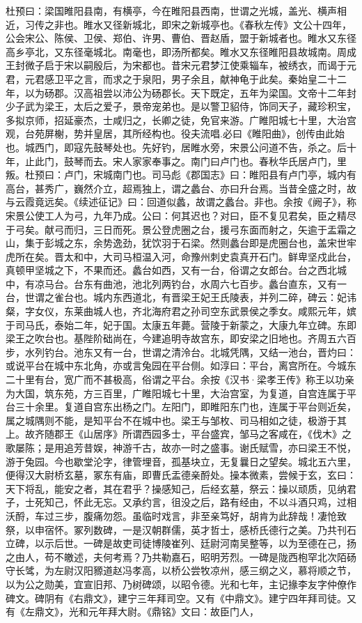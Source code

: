 \documentclass[12pt,UTF8]{ctexbook}
\begin{document}
杜预曰：梁国睢阳县南，有横亭，今在睢阳县西南，世谓之光城，盖光、横声相近，习传之非也。睢水又径新城北，即宋之新城亭也。《春秋左传》文公十四年，公会宋公、陈侯、卫侯、郑伯、许男、曹伯、晋赵盾，盟于新城者也。睢水又东径高乡亭北，又东径毫城北。南毫也，即汤所都矣。睢水又东径睢阳县故城南。周成王封微子启于宋以嗣殷后，为宋都也。昔宋元君梦江使乘辎车，被绣衣，而谒于元君，元君感卫平之言，而求之于泉阳，男子余且，献神龟于此矣。秦始皇二十二年，以为砀郡。汉高祖尝以沛公为砀郡长。天下既定，五年为梁国。文帝十二年封少子武为梁王，太后之爱子，景帝宠弟也。是以警卫貂侍，饰同天子，藏珍积宝，多拟京师，招延豪杰，士咸归之，长卿之徒，免官来游。广睢阳城七十里，大治宫观，台苑屏榭，势并皇居，其所经构也。役夫流唱.必曰《睢阳曲》，创传由此始也。城西门，即寇先鼓琴处也。先好钓，居睢水旁，宋景公问道不告，杀之。后十年，止此门，鼓琴而去。宋人家家奉事之。南门曰卢门也。春秋华氏居卢门，里叛。杜预曰：卢门，宋城南门也。司马彪《郡国志》曰：睢阳县有卢门亭，城内有高台，甚秀广，巍然介立，超焉独上，谓之蠡台、亦曰升台焉。当昔全盛之时，故与云霞竟远矣。《续述征记》曰：回道似蠡，故谓之蠡台。非也。余按《阙子》，称宋景公使工人为弓，九年乃成。公曰：何其迟也？对曰，臣不复见君矣，臣之精尽于弓矣。献弓而归，三日而死。景公登虎圈之台，援弓东面而射之，矢逾于盂霜之山，集于彭城之东，余势逸劲，犹饮羽于石梁。然则蠡台即是虎圈台也，盖宋世牢虎所在矣。晋太和中，大司马桓温入河，命豫州刺史袁真开石门。鲜卑坚戍此台，真顿甲坚城之下，不果而还。蠡台如西，又有一台，俗谓之女郎台。台之西北城中，有凉马台。台东有曲池，池北列两钓台，水周六七百步。蠡台直东，又有一台，世谓之雀台也。城内东西道北，有晋梁王妃王氏陵表，并列二碎，碑云：妃讳粲，字女仪，东莱曲城人也，齐北海府君之孙司空东武景侯之季女。咸熙元年，嫔于司马氏，泰始二年，妃于国。太康五年薨。营陵于新蒙之，大康九年立碑。东即梁王之吹台也。基陛阶础尚在，今建追明寺故宫东，即安梁之旧地也。齐周五六百步，水列钓台。池东又有一台，世谓之清泠台。北城凭隅，又结一池台，晋灼曰：或说平台在城中东北角，亦或言兔园在平台侧。如淳曰：平台，离宫所在。今城东二十里有台，宽广而不甚极高，俗谓之平台。余按《汉书·梁孝王传》称王以功亲为大国，筑东苑，方三百里，广睢阳城七十里，大治宫室，为复道，自宫连属于平台三十余里。复道自宫东出杨之门。左阳门，即睢阳东门也，连属于平台则近矣，属之城隅则不能，是知平台不在城中也。梁王与邹枚、司马相如之徒，极游于其上。故齐随郡王《山居序》所谓西园多士，平台盛宾，邹马之客咸在，《伐木》之歌屡陈；是用追芳昔娱，神游千古，故亦一时之盛事。谢氏赋雪，亦曰梁王不悦，游于兔园。今也歇堂沦字，律管埋音，孤基块立，无复曩日之望矣。城北五六里，便得汉大尉桥玄墓，冢东有庙，即曹氏盂德亲酹处。操本微素，尝候于玄，玄曰：天下将乱，能安之者，其在君乎？操感知己，后经玄墓，祭云：操以顽质，见纳君子，士死知己，怀此无忘。又承约言，徂没之后，路有经由，不以斗酒只鸡，过相沃酹，车过三步，腹痛勿怨。虽临时戏言，非至亲笃好，胡肯为此辞哉！凄怆致祭，以申宿怀。冢列数碑，一是汉朝群儒，英才哲士，感桥氏德行之美。乃共刊石立碑，以示后世。一碑是故吏司徒博陵崔列、廷尉河南吴整等，以为至德在己，扬之由人，苟不皦述，夫何考焉？乃共勒嘉石，昭明芳烈。一碑是陇西枹罕北次陌砀守长骘，为左尉汉阳豲道赵冯孝高，以桥公尝牧凉州，感三纲之义，慕将顺之节，以为公之勋美，宜宣旧邦、乃树碑颂，以昭令德。光和七年，主记掾李友字仲僚作碑文。碑阴有《右鼎文》，建宁三年拜司空。又有《中鼎文》。建宁四年拜司徒。又有《左鼎文》，光和元年拜大尉。《鼎铭》文曰：故臣门人，
\end{document}
